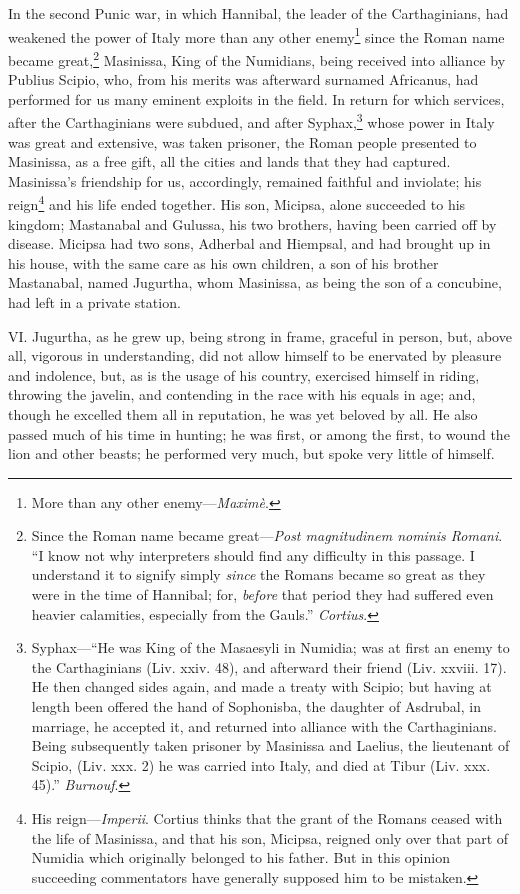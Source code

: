 In the second Punic war, in which Hannibal, the leader of the
Carthaginians, had weakened the power of Italy more than any other
enemy\footnote{More than any other enemy—\emph{Maximè}.} since the Roman name became great,\footnote{Since the Roman name became great—\emph{Post magnitudinem nominis
Romani}. ``I know not why interpreters should find any difficulty in
this passage. I understand it to signify simply \emph{since} the Romans
became so great as they were in the time of Hannibal; for, \emph{before}
that period they had suffered even heavier calamities, especially
from the Gauls.'' \emph{Cortius}.} Masinissa, King of
the Numidians, being received into alliance by Publius Scipio, who,
from his merits was afterward surnamed Africanus, had performed for us
many eminent exploits in the field. In return for which services,
after the Carthaginians were subdued, and after Syphax,\footnote{Syphax—``He was King of the Masaesyli in Numidia; was at first
an enemy to the Carthaginians (Liv. xxiv. 48), and afterward their
friend (Liv. xxviii. 17). He then changed sides again, and made
a treaty with Scipio; but having at length been offered the hand of
Sophonisba, the daughter of Asdrubal, in marriage, he accepted it,
and returned into alliance with the Carthaginians. Being subsequently
taken prisoner by Masinissa and Laelius, the lieutenant of Scipio,
(Liv. xxx. 2) he was carried into Italy, and died at Tibur (Liv. xxx.
45).'' \emph{Burnouf}.} whose
power in Italy was great and extensive, was taken prisoner, the Roman
people presented to Masinissa, as a free gift, all the cities and
lands that they had captured. Masinissa's friendship for us,
accordingly, remained faithful and inviolate; his reign\footnote{His reign—\emph{Imperii}. Cortius thinks that the grant of the
Romans ceased with the life of Masinissa, and that his son, Micipsa,
reigned only over that part of Numidia which originally belonged to
his father. But in this opinion succeeding commentators have generally
supposed him to be mistaken.} and his
life ended together. His son, Micipsa, alone succeeded to his kingdom;
Mastanabal and Gulussa, his two brothers, having been carried off by
disease. Micipsa had two sons, Adherbal and Hiempsal, and had brought
up in his house, with the same care as his own children, a son of his
brother Mastanabal, named Jugurtha, whom Masinissa, as being the son
of a concubine, had left in a private station.

VI. Jugurtha, as he grew up, being strong in frame, graceful in
person, but, above all, vigorous in understanding, did not allow
himself to be enervated by pleasure and indolence, but, as is the
usage of his country, exercised himself in riding, throwing the
javelin, and contending in the race with his equals in age; and,
though he excelled them all in reputation, he was yet beloved by all.
He also passed much of his time in hunting; he was first, or among the
first, to wound the lion and other beasts; he performed very much, but
spoke very little of himself.

